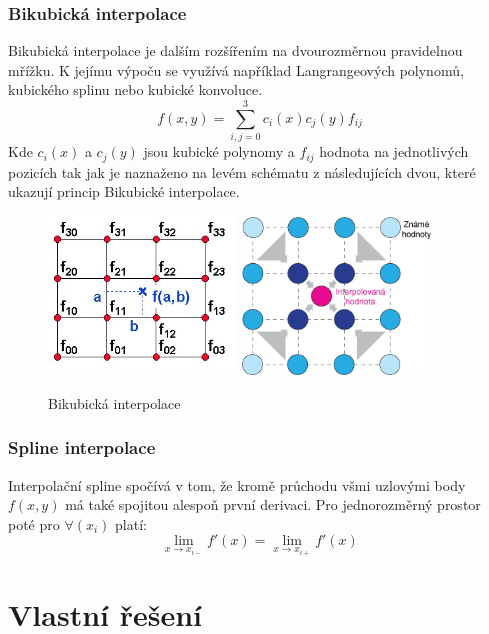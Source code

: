 \documentclass{thesis}%
\begin{document}
 \subsection{Bikubická interpolace}
 Bikubická interpolace je dalším rozšířením na  dvourozměrnou pravidelnou mřížku. K jejímu výpoču se využívá například Langrangeových polynomů, kubického splinu nebo kubické konvoluce.
 \begin{equation}
f(x,y) = \sum\limits_{i,j=0}^3 c_{i}(x)c_{j}(y)f_{ij}
\end{equation}
Kde $c_{i}(x)$ a $c_{j}(y)$  jsou kubické polynomy a $f_{ij}$ hodnota na jednotlivých pozicích tak jak je naznaženo na levém schématu z následujících dvou, které ukazují princip Bikubické interpolace.
 \begin{figure}[ht!]
  \centering
	\includegraphics[width=5cm]{bikubicka2.png}
	\includegraphics[width=5cm]{bikubicka.png}
	\caption[Bikubická interpolace]{Bikubická interpolace}
\end{figure}
 \subsection{Spline interpolace}
 Interpolační spline spočívá v tom, že kromě průchodu všmi uzlovými body $f(x,y)$ má také spojitou alespoň první derivaci. Pro jednorozměrný prostor poté pro $\forall (x_{i})$ platí:
\begin{equation}
\lim_{x\rightarrow x_{i-}}  f'(x) = \lim_{x\rightarrow x_{i+}} f'(x)
\end{equation}

\chapter{Vlastní řešení}
\end{document}
